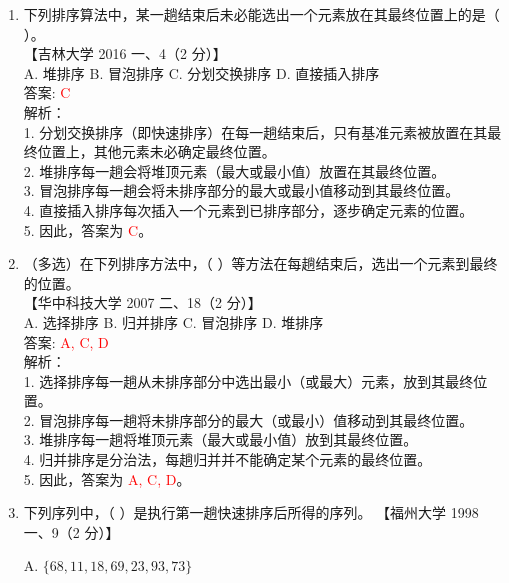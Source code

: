 \documentclass[lang=cn,newtx,10pt,scheme=chinese]{../../../elegantbook}
\begin{document}
\begin{enumerate}
    \item 下列排序算法中，某一趟结束后未必能选出一个元素放在其最终位置上的是（ ）。\\
    【吉林大学 2016 一、4（2 分）】 \\

    A. 堆排序 \quad B. 冒泡排序 \quad C. 分划交换排序 \quad D. 直接插入排序 \\

    答案: \textcolor{red}{C} \\

    解析：\\
    1. 分划交换排序（即快速排序）在每一趟结束后，只有基准元素被放置在其最终位置上，其他元素未必确定最终位置。\\
    2. 堆排序每一趟会将堆顶元素（最大或最小值）放置在其最终位置。\\
    3. 冒泡排序每一趟会将未排序部分的最大或最小值移动到其最终位置。\\
    4. 直接插入排序每次插入一个元素到已排序部分，逐步确定元素的位置。\\
    5. 因此，答案为 \textcolor{red}{C}。\\ 

    \item （多选）在下列排序方法中，（ ）等方法在每趟结束后，选出一个元素到最终的位置。\\
    【华中科技大学 2007 二、18（2 分）】\\  

    A. 选择排序 \quad B. 归并排序 \quad C. 冒泡排序 \quad D. 堆排序 \\

    答案: \textcolor{red}{A, C, D} \\

    解析：\\
    1. 选择排序每一趟从未排序部分中选出最小（或最大）元素，放到其最终位置。\\
    2. 冒泡排序每一趟将未排序部分的最大（或最小）值移动到其最终位置。\\
    3. 堆排序每一趟将堆顶元素（最大或最小值）放到其最终位置。\\
    4. 归并排序是分治法，每趟归并并不能确定某个元素的最终位置。\\
    5. 因此，答案为 \textcolor{red}{A, C, D}。\\

    \item 下列序列中，（ ）是执行第一趟快速排序后所得的序列。  
    【福州大学 1998 一、9（2 分）】 

    A. $\{68, 11, 18, 69, 23, 93, 73\}$  


\end{enumerate}
\end{document}
